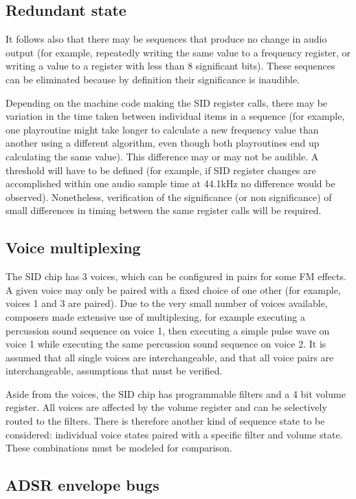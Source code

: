 \documentclass[10pt]{article}
\begin{document}
\begin{multicols*}{2}
\subsection{Redundant state}

It follows also that there may be sequences that produce no change in audio output (for example, repeatedly writing the same value to a frequency register, or writing a value to a register with less than 8 significant bits). These sequences can be eliminated because by definition their significance is inaudible.

Depending on the machine code making the SID register calls, there may be variation in the time taken between individual items in a sequence (for example, one playroutine might take longer to calculate a new frequency value than another using a different algorithm, even though both playroutines end up calculating the same value). This difference may or may not be audible. A threshold will have to be defined (for example, if SID register changes are accomplished within one audio sample time at 44.1kHz no difference would be observed). Nonetheless, verification of the significance (or non significance) of small differences in timing between the same register calls will be required.

\subsection{Voice multiplexing}

The SID chip has 3 voices, which can be configured in pairs for some FM effects. A given voice may only be paired with a fixed choice of one other (for example, voices 1 and 3 are paired). Due to the very small number of voices available, composers made extensive use of multiplexing, for example executing a percussion sound sequence on voice 1, then executing a simple pulse wave on voice 1 while executing the same percussion sound sequence on voice 2. It is assumed that all single voices are interchangeable, and that all voice pairs are interchangeable, assumptions that must be verified.

Aside from the voices, the SID chip has programmable filters and a 4 bit volume register. All voices are affected by the volume register and can be selectively routed to the filters. There is therefore another kind of sequence state to be considered: individual voice states paired with a specific filter and volume state. These combinations must be modeled for comparison.

\subsection{ADSR envelope bugs}


\end{multicols*}
\end{document}

